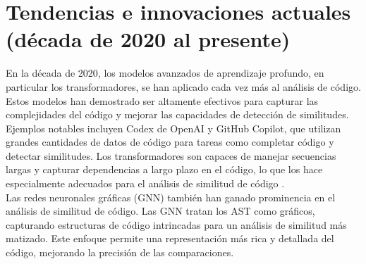 \section*{\textbf{Tendencias e innovaciones actuales (década de 2020 al presente)}}
En la década de 2020, los modelos avanzados de aprendizaje profundo, en particular los transformadores, se han aplicado cada vez más al análisis de código. Estos modelos han demostrado ser altamente efectivos para capturar las complejidades del código y mejorar las capacidades de detección de similitudes. \\

Ejemplos notables incluyen Codex de OpenAI y GitHub Copilot, que utilizan grandes cantidades de datos de código para tareas como completar código y detectar similitudes. Los transformadores son capaces de manejar secuencias largas y capturar dependencias a largo plazo en el código, lo que los hace especialmente adecuados para el análisis de similitud de código \cite{vaswani2017attention}. \\

Las redes neuronales gráficas (GNN) también han ganado prominencia en el análisis de similitud de código. Las GNN tratan los AST como gráficos, capturando estructuras de código intrincadas para un análisis de similitud más matizado. Este enfoque permite una representación más rica y detallada del código, mejorando la precisión de las comparaciones.


